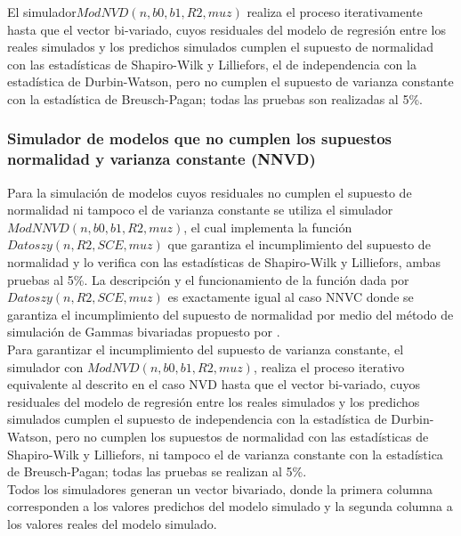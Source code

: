 El simulador$ ModNVD(n,b0,b1,R2,muz)$ realiza el proceso iterativamente hasta que el vector bi-variado, cuyos residuales del modelo de regresión entre los reales simulados y los predichos simulados cumplen el supuesto de normalidad con las estadísticas de Shapiro-Wilk y Lilliefors, el de independencia con la estadística de Durbin-Watson, pero no cumplen el supuesto de varianza constante con la estadística de Breusch-Pagan; todas las pruebas son realizadas al 5\%. 

\subsubsection{Simulador de modelos que no cumplen los supuestos normalidad y varianza constante (NNVD)}

Para la simulación de modelos cuyos residuales no cumplen el supuesto de normalidad ni tampoco el de varianza constante se utiliza el simulador $ModNNVD(n,b0,b1,R2,muz)$, el cual implementa la función $Datoszy(n,R2,SCE,muz)$ que garantiza el incumplimiento del supuesto de normalidad y lo verifica con las estadísticas de Shapiro-Wilk y Lilliefors, ambas pruebas al 5\%. La descripción y el funcionamiento de la función dada por \newline $Datoszy(n,R2,SCE,muz)$ es exactamente igual al caso NNVC donde se garantiza el incumplimiento del supuesto de normalidad por medio del método de simulación de Gammas bivariadas propuesto por \textcite{cheng-2011}.\\


Para garantizar el incumplimiento del supuesto de varianza constante, el simulador con \newline $ModNVD(n,b0,b1,R2,muz)$, realiza el proceso iterativo equivalente al descrito en el caso NVD hasta que el vector bi-variado, cuyos residuales del modelo de regresión entre los reales simulados y los predichos simulados cumplen el supuesto de independencia con la estadística de Durbin-Watson, pero no cumplen los supuestos de normalidad con las estadísticas de Shapiro-Wilk y Lilliefors, ni tampoco el de varianza constante con la estadística de Breusch-Pagan; todas las pruebas se realizan al 5\%.\\ 


Todos los simuladores generan un vector bivariado, donde la primera columna corresponden a los valores predichos del modelo simulado y la segunda columna a los valores reales del modelo simulado.\\




